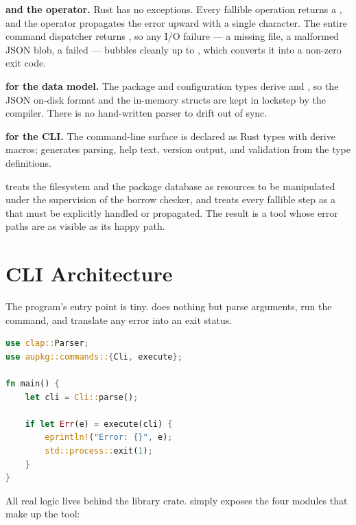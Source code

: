 \textbf{ and the  operator.} Rust has no exceptions. Every fallible operation returns a , and the  operator propagates the error upward with a single character. The entire command dispatcher returns , so any I/O failure --- a missing file, a malformed JSON blob, a failed  --- bubbles cleanly up to , which converts it into a non-zero exit code.

\textbf{ for the data model.} The package and configuration types derive  and , so the JSON on-disk format and the in-memory structs are kept in lockstep by the compiler. There is no hand-written parser to drift out of sync.

\textbf{ for the CLI.} The command-line surface is declared as Rust types with derive macros;  generates parsing, help text, version output, and validation from the type definitions.

\begin{infobox}
 treats the filesystem and the package database as resources to be manipulated under the supervision of the borrow checker, and treats every fallible step as a  that must be explicitly handled or propagated. The result is a tool whose error paths are as visible as its happy path.
\end{infobox}

\section{CLI Architecture}

The program's entry point is tiny.  does nothing but parse arguments, run the command, and translate any error into an exit status.

\begin{lstlisting}[language=Rust, caption={\file{main.rs} --- parse, execute, exit}]
use clap::Parser;
use aupkg::commands::{Cli, execute};

fn main() {
    let cli = Cli::parse();

    if let Err(e) = execute(cli) {
        eprintln!("Error: {}", e);
        std::process::exit(1);
    }
}
\end{lstlisting}

All real logic lives behind the library crate.  simply exposes the four modules that make up the tool:


